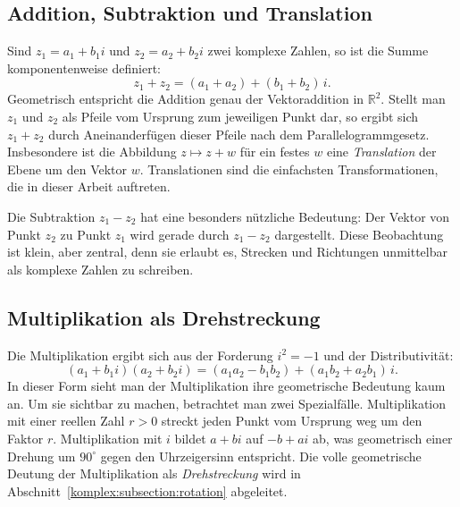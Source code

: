 \subsection{Addition, Subtraktion und Translation
\label{komplex:subsection:addition}}
Sind $z_1 = a_1 + b_1 i$ und $z_2 = a_2 + b_2 i$ zwei komplexe Zahlen,
so ist die Summe komponentenweise definiert:
\begin{equation}
z_1 + z_2
=
(a_1 + a_2) + (b_1 + b_2) \, i .
\label{komplex:eq:addition}
\end{equation}
Geometrisch entspricht die Addition genau der Vektoraddition in
$\mathbb{R}^2$.
Stellt man $z_1$ und $z_2$ als Pfeile vom Ursprung zum jeweiligen Punkt dar,
so ergibt sich $z_1 + z_2$ durch Aneinanderfügen dieser Pfeile nach dem
Parallelogrammgesetz.
Insbesondere ist die Abbildung $z \mapsto z + w$ für ein festes $w$
eine \emph{Translation} der Ebene um den Vektor $w$.
%
Translationen sind die einfachsten Transformationen,
die in dieser Arbeit auftreten.

Die Subtraktion $z_1 - z_2$ hat eine besonders nützliche Bedeutung:
Der Vektor von Punkt $z_2$ zu Punkt $z_1$ wird gerade durch $z_1 - z_2$
dargestellt.
Diese Beobachtung ist klein, aber zentral,
denn sie erlaubt es, Strecken und Richtungen unmittelbar als komplexe
Zahlen zu schreiben.

%
%
\subsection{Multiplikation als Drehstreckung
\label{komplex:subsection:multiplikation}}
Die Multiplikation ergibt sich aus der Forderung $i^2 = -1$ und der
Distributivität:
\begin{equation}
(a_1 + b_1 i)(a_2 + b_2 i)
=
(a_1 a_2 - b_1 b_2) + (a_1 b_2 + a_2 b_1) \, i .
\label{komplex:eq:multiplikation-kartesisch}
\end{equation}
In dieser Form sieht man der Multiplikation ihre geometrische Bedeutung
kaum an.
Um sie sichtbar zu machen, betrachtet man zwei Spezialfälle.
Multiplikation mit einer reellen Zahl $r > 0$ streckt jeden Punkt vom
Ursprung weg um den Faktor $r$.
Multiplikation mit $i$ bildet $a + bi$ auf $-b + ai$ ab,
was geometrisch einer Drehung um $90^\circ$ gegen den Uhrzeigersinn
entspricht.
Die volle geometrische Deutung der Multiplikation als \emph{Drehstreckung}
%
wird in Abschnitt~\ref{komplex:subsection:rotation} abgeleitet.

%
%
